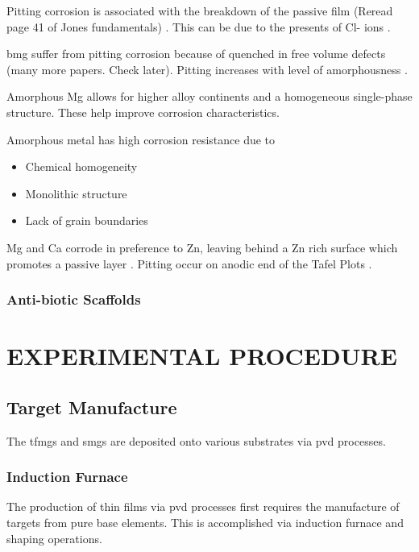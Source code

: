 \documentclass[a4paper,12pt,oneside]{report}%
\begin{document}
Pitting corrosion is associated with the breakdown of the passive film (Reread page 41 of Jones fundamentals) \cite{Zheng2014, Jones1992, Schweitzer2009}. This can be due to the presents of Cl- ions \cite{Zheng2014}. 

 \Gls{bmg} suffer from pitting corrosion because of quenched in free volume defects \cite{Wang2012} (many more papers. Check later). Pitting increases with level of amorphousness \cite{Schluter2012}. 

Amorphous Mg allows for higher alloy continents and a homogeneous single-phase structure. These help improve corrosion characteristics. 

Amorphous metal has high corrosion resistance due to

\begin{itemize}
	\item Chemical homogeneity 
	\item Monolithic structure
	\item Lack of grain boundaries 
\end{itemize}
 
Mg and Ca corrode in preference to Zn, leaving behind a Zn rich surface which promotes a passive layer \cite{Wang2012}.
Pitting occur on anodic end of the Tafel Plots \cite{Schluter2012}.

\subsection{Anti-biotic Scaffolds}

\chapter{EXPERIMENTAL PROCEDURE}
\glsresetall

\section{Target Manufacture}
The \glspl{tfmg} and \glspl{smg} are deposited onto various substrates via \gls{pvd} processes.

\subsection{Induction Furnace} 
The production of thin films via \gls{pvd} processes first requires the manufacture of targets from pure base elements. This is accomplished via induction furnace and shaping operations. 
\end{document}
